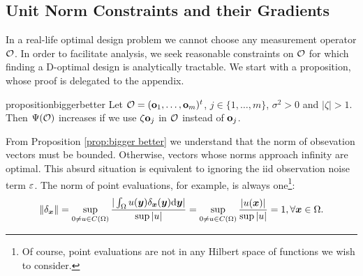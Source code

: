 \subsection{Unit Norm Constraints and their Gradients}\label{subsec:unit norm}
In a real-life optimal design problem we cannot choose any measurement
operator $\mathcal{O}$. In order to facilitate analysis, we seek reasonable
constraints on $\mathcal{O}$ for which finding a D-optimal design is
analytically tractable. We start with a proposition, whose proof is
delegated to the appendix.

\begin{restatable*}{proposition}{biggerbetter}\label{prop:bigger better}
  Let $\mathcal{O} = (\mathbf{o}_1,\dots,\mathbf{o}_m)^t$, $j \in \{1,\dots,m\}$,
  $\sigma^2 > 0$ and $|\zeta| > 1$. Then $\Psi(\mathcal{O})$ increases if we
  use $\zeta \mathbf{o}_j$ in $\mathcal{O}$ instead of $\mathbf{o}_j$.
\end{restatable*}


From Proposition \ref{prop:bigger better} we understand that the norm
of obsevation vectors must be bounded. Otherwise, vectors whose norms
approach infinity are optimal. This absurd situation is equivalent to
ignoring the iid observation noise term $\varepsilon$. The norm of point
evaluations, for example, is always one\footnote{Of course, point
evaluations are not in any Hilbert space of functions we wish to
consider.}:
\begin{align*}
  \| \delta_{\x} \| = \sup_{0 \neq u \in C(\Omega)} \frac{
    |\int_{\Omega}u(\y) \delta_{\x}(\y) \der \y| 
  }{
    \sup|u|}
  = \sup_{0 \neq u \in C(\Omega)} \frac{|u(\x)|}{ \sup|u|} = 1,
  \forall \x \in \Omega.
\end{align*}

